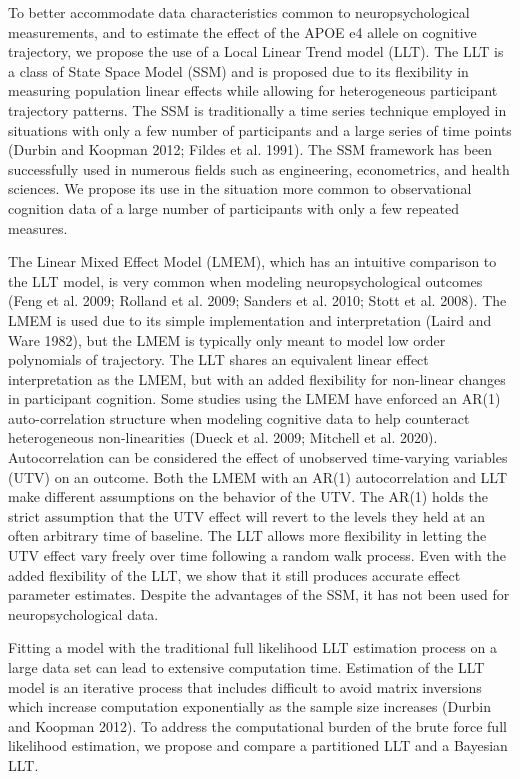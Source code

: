 \documentclass[
]{article}
\begin{document}
To better accommodate data characteristics common to neuropsychological measurements, and to estimate the effect of the APOE e4 allele on cognitive trajectory, we propose the use of a Local Linear Trend model (LLT). The LLT is a class of State Space Model (SSM) and is proposed due to its flexibility in measuring population linear effects while allowing for heterogeneous participant trajectory patterns. The SSM is traditionally a time series technique employed in situations with only a few number of participants and a large series of time points (Durbin and Koopman 2012; Fildes et al. 1991). The SSM framework has been successfully used in numerous fields such as engineering, econometrics, and health sciences. We propose its use in the situation more common to observational cognition data of a large number of participants with only a few repeated measures.

The Linear Mixed Effect Model (LMEM), which has an intuitive comparison to the LLT model, is very common when modeling neuropsychological outcomes (Feng et al. 2009; Rolland et al. 2009; Sanders et al. 2010; Stott et al. 2008). The LMEM is used due to its simple implementation and interpretation (Laird and Ware 1982), but the LMEM is typically only meant to model low order polynomials of trajectory. The LLT shares an equivalent linear effect interpretation as the LMEM, but with an added flexibility for non-linear changes in participant cognition. Some studies using the LMEM have enforced an AR(1) auto-correlation structure when modeling cognitive data to help counteract heterogeneous non-linearities (Dueck et al. 2009; Mitchell et al. 2020). Autocorrelation can be considered the effect of unobserved time-varying variables (UTV) on an outcome. Both the LMEM with an AR(1) autocorrelation and LLT make different assumptions on the behavior of the UTV. The AR(1) holds the strict assumption that the UTV effect will revert to the levels they held at an often arbitrary time of baseline. The LLT allows more flexibility in letting the UTV effect vary freely over time following a random walk process. Even with the added flexibility of the LLT, we show that it still produces accurate effect parameter estimates. Despite the advantages of the SSM, it has not been used for neuropsychological data.

Fitting a model with the traditional full likelihood LLT estimation process on a large data set can lead to extensive computation time. Estimation of the LLT model is an iterative process that includes difficult to avoid matrix inversions which increase computation exponentially as the sample size increases (Durbin and Koopman 2012). To address the computational burden of the brute force full likelihood estimation, we propose and compare a partitioned LLT and a Bayesian LLT.
\end{document}

